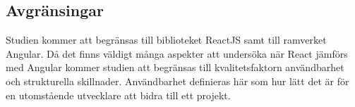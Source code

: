 \subsection{Avgränsingar}
\label{subsec:axel-delimitations}
Studien kommer att begränsas till biblioteket ReactJS samt till ramverket Angular. Då det finns väldigt många aspekter att undersöka när React jämförs med Angular kommer studien att begränsas till kvalitetsfaktorn användbarhet och strukturella skillnader. Användbarhet definieras här som hur lätt det är för en utomstående utvecklare att bidra till ett projekt.

